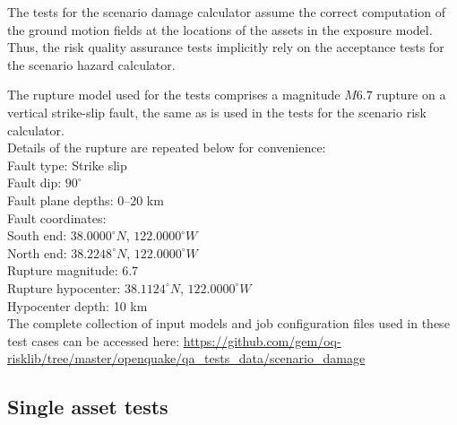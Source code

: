 The tests for the scenario damage calculator assume the correct computation of the ground motion fields at the locations of the assets in the exposure model. Thus, the risk quality assurance tests implicitly rely on the acceptance tests for the scenario hazard calculator.

The rupture model used for the tests comprises a magnitude $M6.7$ rupture on a vertical strike-slip fault, the same as is used in the tests for the scenario risk calculator.\\

\noindent Details of the rupture are repeated below for convenience:\\

\noindent
Fault type: Strike slip\\
Fault dip: $90^{\circ}$\\
Fault plane depths: 0--20 km\\
Fault coordinates:\\
South end: $38.0000^{\circ} N$, $122.0000^{\circ} W$\\
North end: $38.2248^{\circ} N$, $122.0000^{\circ} W$\\
Rupture magnitude: 6.7\\
Rupture hypocenter: $38.1124^{\circ} N$, $122.0000^{\circ} W$\\
Hypocenter depth: 10 km\\

The complete collection of input models and job configuration files used in these test cases can be accessed here:
\href{https://github.com/gem/oq-risklib/tree/master/openquake/qa_tests_data/scenario_damage}
{https://github.com/gem/oq-risklib/tree/master/openquake/qa\_tests\_data/scenario\_damage}

\subsection{Single asset tests}
\label{subsec:acc-sd-single}


% 

% 
